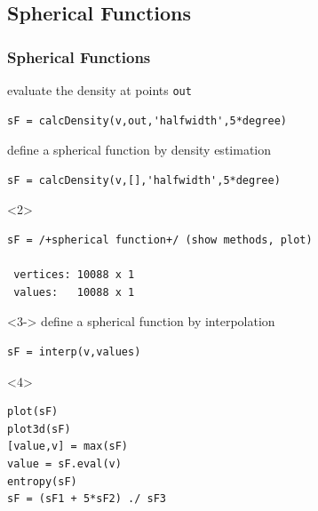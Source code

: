 \documentclass[compress]{beamer}
\begin{document}
\subsection*{Spherical Functions}


\begin{frame}[fragile]
  \frametitle{Spherical Functions}
  \begin{overlayarea}{\textwidth}{8cm}
    evaluate the density at points \texttt{out}
        \begin{lstlisting}[style=input]
sF = calcDensity(v,out,'halfwidth',5*degree)
        \end{lstlisting}

        \pause

define a spherical function by density estimation
        \begin{lstlisting}[style=input]
sF = calcDensity(v,[],'halfwidth',5*degree)
        \end{lstlisting}
      \begin{onlyenv}<2>
        \vspace{-0.3cm}
        \begin{lstlisting}[style=output]
sF = /+spherical function+/ (show methods, plot)

 vertices: 10088 x 1
 values:   10088 x 1
\end{lstlisting}
\end{onlyenv}

\begin{onlyenv}<3->
define a spherical function by interpolation
  \begin{lstlisting}[style=input]
sF = interp(v,values)
  \end{lstlisting}
\end{onlyenv}


      \begin{onlyenv}<4>
        \begin{lstlisting}[style=input]
plot(sF)
plot3d(sF)
[value,v] = max(sF)
value = sF.eval(v)
entropy(sF)
sF = (sF1 + 5*sF2) ./ sF3
        \end{lstlisting}
      \end{onlyenv}
      \end{overlayarea}



\end{frame}
\end{document}
